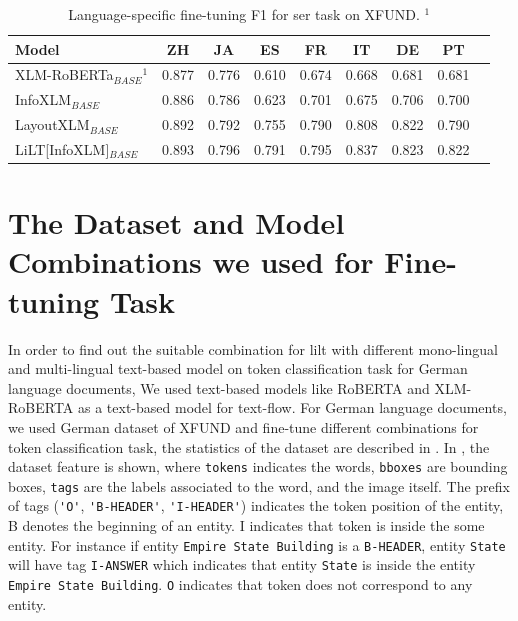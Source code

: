 \begin{table}[!ht]
    \centering
    \begin{tabular}{lcccccccl}
    \toprule
          Model&ZH&JA&ES&FR&IT&DE&PT  \\ \midrule
         XLM-RoBERTa\(_{BASE}\)$^1$& 0.877&0.776&0.610&0.674&0.668&0.681&0.681 \\
         InfoXLM\(_{BASE}\)&  0.886 & 0.786 & 0.623 &0.701 & 0.675 & 0.706 & 0.700 \\
         LayoutXLM\(_{BASE}\) &  0.892 & 0.792 & 0.755 & 0.790 & 0.808 & 0.822 & 0.790 \\ \midrule
         LiLT[InfoXLM]\(_{BASE}\) &  0.893 & 0.796 & 0.791& 0.795& 0.837& 0.823& 0.822 \\ \bottomrule
    \end{tabular}
    \caption{Language-specific fine-tuning F1 for \acrshort{ser} task on XFUND. $^1$\cite{li2021cross}}
    \label{tab:Comparision_Xfund}
\end{table}




\section{The Dataset and Model Combinations we used for Fine-tuning Task}


In order to find out the suitable combination for \acrshort{lilt} with different mono-lingual and multi-lingual text-based model on token classification task for German language documents, We used text-based models like RoBERTA and XLM-RoBERTA as a text-based model for text-flow. For German language documents, we used German dataset of XFUND and fine-tune different combinations for token classification task, the statistics of the dataset are described in . In , the dataset feature is shown, where \verb|tokens| indicates the words, \verb|bboxes| are bounding boxes, \verb|tags| are the labels associated to the word, and the image itself. The prefix of tags (\verb|'O'|, \verb|'B-HEADER'|, \verb|'I-HEADER'|) indicates the token position of the entity, B denotes the beginning of an entity. I indicates that token is inside the some entity. For instance if entity \verb|Empire State Building| is a \verb|B-HEADER|, entity \verb|State| will have tag \verb|I-ANSWER| which indicates that entity \verb|State| is inside the entity \verb|Empire State Building|. \verb|O| indicates that token does not correspond to any entity. 

